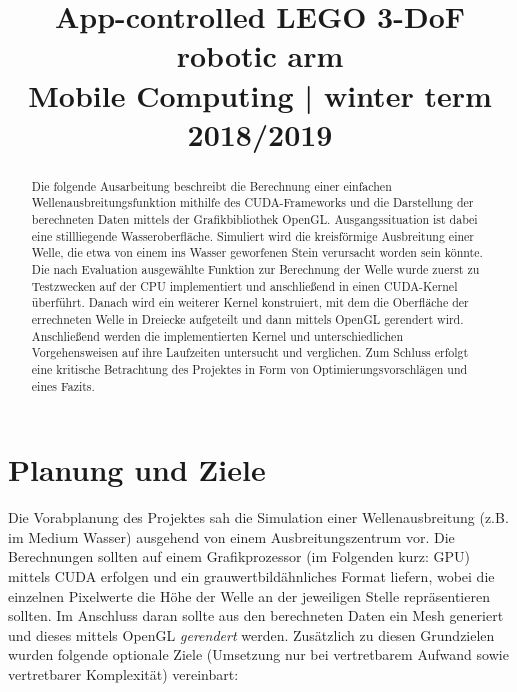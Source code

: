 \documentclass[conference]{IEEEtran}
\begin{document}
\title{App-controlled LEGO 3-DoF robotic arm\\
{\footnotesize Mobile Computing | winter term 2018/2019}
}

\author{
\and
{}
}

\maketitle

\begin{abstract}
Die folgende Ausarbeitung beschreibt die Berechnung einer einfachen Wellenausbreitungsfunktion mithilfe des CUDA-Frameworks und die Darstellung der berechneten Daten mittels der Grafikbibliothek OpenGL. Ausgangssituation ist dabei eine stillliegende Wasseroberfl\"ache. Simuliert wird die kreisf\"ormige Ausbreitung einer Welle, die etwa von einem ins Wasser geworfenen Stein verursacht worden sein k\"onnte. Die nach Evaluation ausgew\"ahlte Funktion zur Berechnung der Welle wurde zuerst zu Testzwecken auf der CPU implementiert und anschlie{\ss}end in einen CUDA-Kernel \"uberf\"uhrt. Danach wird ein weiterer Kernel konstruiert, mit dem die Oberfl\"ache der errechneten Welle in Dreiecke aufgeteilt und dann mittels OpenGL gerendert wird. Anschlie{\ss}end werden die implementierten Kernel und unterschiedlichen Vorgehensweisen auf ihre Laufzeiten untersucht und verglichen. Zum Schluss erfolgt eine kritische Betrachtung des Projektes in Form von Optimierungsvorschl\"agen und eines Fazits.
\end{abstract}


\section{Planung und Ziele}
Die Vorabplanung des Projektes sah die Simulation einer Wellenausbreitung (z.B. im Medium Wasser) ausgehend von einem Ausbreitungszentrum vor. Die Berechnungen sollten auf einem Grafikprozessor (im Folgenden kurz: GPU) mittels CUDA erfolgen und ein grauwertbild\"ahnliches Format liefern, wobei die einzelnen Pixelwerte die H\"ohe der Welle an der jeweiligen Stelle repr\"asentieren sollten. Im Anschluss daran sollte aus den berechneten Daten ein Mesh generiert und dieses mittels OpenGL \textit{gerendert} werden. Zus\"atzlich zu diesen Grundzielen wurden folgende optionale Ziele (Umsetzung nur bei vertretbarem Aufwand sowie vertretbarer Komplexit\"at) vereinbart:
\end{document}
